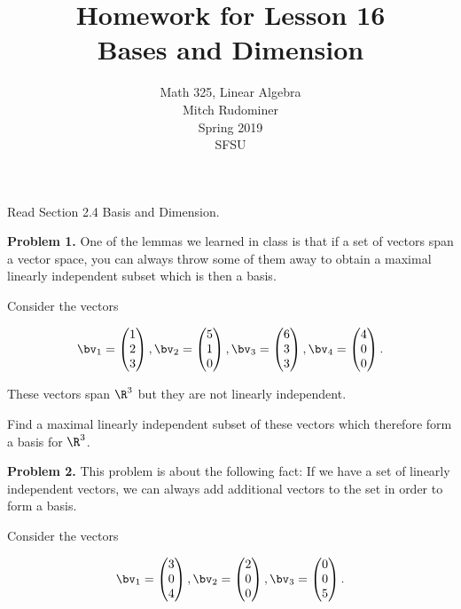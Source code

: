 \documentclass[oneside,12pt]{amsart}
\begin{document}
\title{Homework for Lesson 16 \\ Bases and Dimension}
\author{Math 325, Linear Algebra \\ Mitch Rudominer \\ Spring 2019 \\ SFSU }
\date{}

\maketitle

Read Section 2.4 Basis and Dimension.

\bigskip

\textbf{Problem 1.} One of the lemmas we learned in class is that if a set
of vectors span a vector space, you can always throw some of them away to
obtain a maximal linearly independent subset which is then a basis.

Consider the vectors

$$
\bv_1 =
\begin{pmatrix}
1 \\ 2 \\3
\end{pmatrix},
\bv_2 =
\begin{pmatrix}
5 \\ 1 \\ 0
\end{pmatrix},
\bv_3 =
\begin{pmatrix}
6 \\ 3 \\ 3
\end{pmatrix},
\bv_4 =
\begin{pmatrix}
4 \\ 0 \\ 0
\end{pmatrix}.
$$

These vectors span $\R^3$ but they are not linearly independent.

Find a maximal linearly independent subset of these vectors which therefore
form a basis for $\R^3$.

\bigskip
\bigskip
\bigskip
\bigskip

\textbf{Problem 2.} This problem is about the following fact: If we have a
set of linearly independent vectors, we can always add additional vectors
to the set in order to form a basis.

Consider the vectors

$$
\bv_1 =
\begin{pmatrix}
3 \\ 0 \\ 4
\end{pmatrix},
\bv_2 =
\begin{pmatrix}
2 \\ 0 \\ 0
\end{pmatrix},
\bv_3 =
\begin{pmatrix}
0 \\ 0 \\ 5
\end{pmatrix}.
$$
\end{document}
